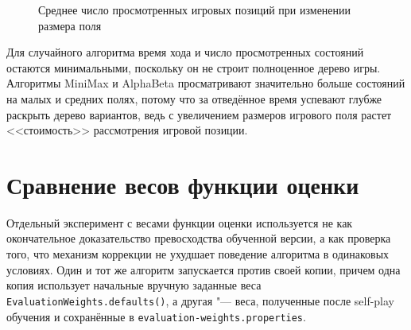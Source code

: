 \documentclass[a4paper,12pt]{diplom}
\begin{document}
\begin{figure}[H]
\centering
{}
\caption{Среднее число просмотренных игровых позиций при изменении размера поля}
\label{fig:nodes_by_size}
\end{figure}

Для случайного алгоритма время хода и число просмотренных состояний остаются минимальными, поскольку он не строит полноценное дерево игры. Алгоритмы MiniMax и AlphaBeta просматривают значительно больше состояний на малых и средних полях, потому что за отведённое время успевают глубже раскрыть дерево вариантов, ведь с увеличением размеров игрового поля растет <<стоимость>> рассмотрения игровой позиции.

\section{Сравнение весов функции оценки}

Отдельный эксперимент с весами функции оценки используется не как окончательное доказательство превосходства обученной версии, а как проверка того, что механизм коррекции не ухудшает поведение алгоритма в одинаковых условиях. Один и тот же алгоритм запускается против своей копии, причем одна копия использует начальные вручную заданные веса \texttt{EvaluationWeights.defaults()}, а другая "--- веса, полученные после self-play обучения и сохранённые в \texttt{evaluation-weights.properties}.
\end{document}
